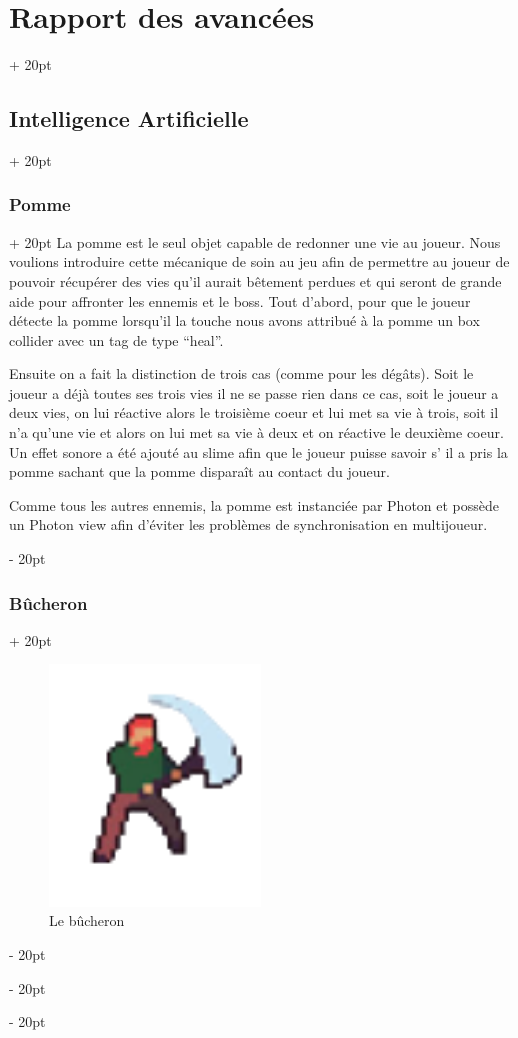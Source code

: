 \documentclass[a4paper, 12pt, twoside]{article}
\newcommand{\ind}[1][20pt]{\advance\leftskip + #1}
\newcommand{\deind}[1][20pt]{\advance\leftskip - #1}
\newenvironment{indt}[2][20pt]{#2 \par \ind[#1]}{\par \deind} %
\begin{document}
\begin{indt}{\section{Rapport des avancées}}
\begin{indt}{\subsection{Intelligence Artificielle}}
\begin{indt}{\subsubsection{Pomme}}
                La pomme est le seul objet capable de redonner une vie au joueur. Nous voulions introduire cette mécanique de soin au jeu afin de permettre au joueur de pouvoir récupérer des vies qu’il aurait bêtement perdues et qui seront de grande aide pour affronter les ennemis et le boss. Tout d’abord, pour que le joueur détecte la pomme lorsqu’il la touche nous avons attribué à la pomme un box collider avec un tag de type “heal”.

                Ensuite on a fait la distinction de trois cas (comme pour les dégâts). Soit le joueur a déjà toutes ses trois vies il ne se passe rien dans ce cas, soit le joueur a deux vies, on lui réactive alors le troisième coeur et lui met sa vie à trois, soit il n’a qu’une vie et alors on lui met sa vie à deux et on réactive le deuxième coeur. Un effet sonore a été ajouté au slime afin que le joueur puisse savoir s' il a pris la pomme sachant que la pomme disparaît au contact du joueur.

                Comme tous les autres ennemis, la pomme est instanciée par Photon et possède un Photon view afin d’éviter les problèmes de synchronisation en multijoueur.
            \end{indt}

            \begin{indt}{\subsubsection{Bûcheron}}
                \begin{figure}[h]
                    \centering
                    \includegraphics[width=0.5\textwidth]{Bucheron.png}
                    \caption{Le bûcheron}
                    \label{fig:mesh1}
                \end{figure}


\end{indt}
\end{indt}
\end{indt}
\end{document}
